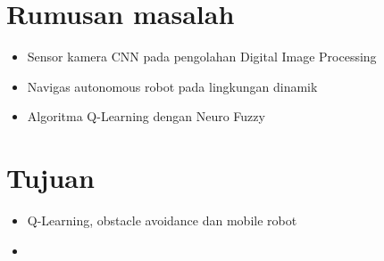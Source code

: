 \section{Rumusan masalah}
\begin{itemize}
	\item Sensor kamera CNN pada pengolahan Digital Image Processing
	\item Navigas autonomous robot pada lingkungan dinamik
	\item Algoritma Q-Learning dengan Neuro Fuzzy
\end{itemize} 


\section{Tujuan}
\begin{itemize}
	\item Q-Learning, obstacle avoidance dan mobile robot
	\item 
\end{itemize}
   
